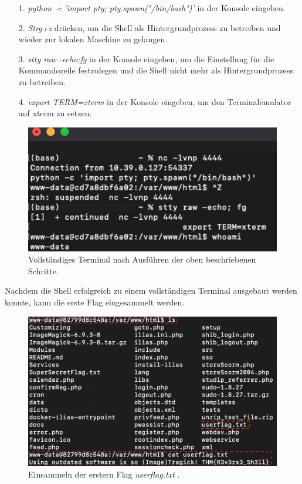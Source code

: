 \documentclass[10pt, a4paper,onecolumn ,titlepage]{article}
\begin{document}
    \begin{enumerate}[leftmargin=2.5cm]
        \item[1.] \textit{python -c 'import pty; pty.spawn("/bin/bash")'}  in der Konsole eingeben.
        \item[2.] \textit{Strg+z}  drücken, um die Shell als Hintergrundprozess zu betreiben und wieder zur lokalen Maschine zu gelangen.
        \item[3.] \textit{stty raw -echo;fg}  in der Konsole eingeben, um die Einstellung für die Kommandozeile festzulegen und die Shell nicht mehr als Hintergrundprozess zu betreiben.
        \item[4.] \textit{export TERM=xterm}  in der Konsole eingeben, um den Terminalemulator auf xterm zu setzen.
    \end{enumerate}

    \begin{figure}[H]
        \centering
        \includegraphics[width=1\textwidth]{storyline_bilder_vm2/shellStabilisierenGanz}
        \caption{Vollständiges Terminal nach Ausführen der oben beschriebenen Schritte.}
        \label{fig:shellStabilisiert}
    \end{figure}
    \noindent
    Nachdem die Shell erfolgreich zu einem vollständigen Terminal ausgebaut werden konnte, kann die erste Flag eingesammelt werden.

    \begin{figure}[H]
        \centering
        \includegraphics[width=1\textwidth]{storyline_bilder_vm2/userflag}
        \caption{Einsammeln der erstern Flag \textit{userflag.txt} .}
        \label{fig:userflag}
    \end{figure}
    \noindent
\end{document}
